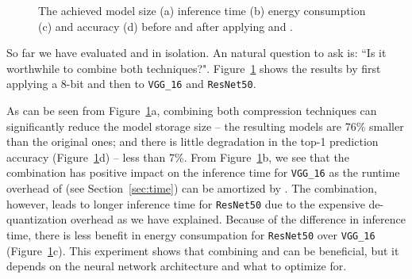 \begin{figure}[!t]
\centering
{}
\hfill
{}
\hfill
{}
\hfill
{}
\hfill
\caption{The achieved model size (a) inference time (b) energy consumption (c) and accuracy (d) before and after applying \quantization and \pruning.
}
\vspace{-5mm}
\label{fig:combine}
\end{figure}

So far we have evaluated \pruning and \quantization in isolation. An natural question to ask is: ``Is it worthwhile to combine both
techniques?". Figure~\ref{fig:combine} shows the results by first applying a 8-bit \dquantization and then \pruning to \texttt{VGG\_16} and \texttt{ResNet50}.


As can be seen from Figure~\ref{fig:combine}a, combining both compression techniques can significantly reduce the model storage size -- the
resulting models are 76\% smaller than the original ones; and there is little degradation in the top-1 prediction accuracy
(Figure~\ref{fig:combine}d) -- less than 7\%. From Figure~\ref{fig:combine}b, we see that the combination has positive impact on the
inference time for \texttt{VGG\_16} as the runtime overhead of \dquantization (see Section~\ref{sec:time}) can be amortized by \pruning.
The combination, however, leads to longer inference time for \texttt{ResNet50} due to the expensive de-quantization overhead as we have
explained. Because of the difference in inference time, there is less benefit in energy consumpation for \texttt{ResNet50} over
\texttt{VGG\_16} (Figure~\ref{fig:combine}c). This experiment shows that combining \pruning and \quantization can be beneficial, but it
depends on the neural network architecture and what to optimize for.
